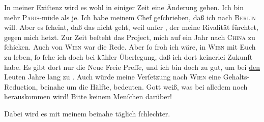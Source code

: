 \pstart
           {\pb}In meiner Exiſtenz wird es wohl in
               einiger Zeit  eine Änderung geben. Ich bin mehr \textsc{Paris}\textcolor{gray}{-}müde als je. Ich habe meinem Chef geſchrieben, daß ich nach \textsc{Berlin} will. Aber es ſcheint, daß das nicht geht, weil unſer \label{K_L02835-3v}\label{K_L02835-3}, der meine
               Rivalität fürchtet, gegen mich hetzt. Zur Zeit beſteht das Project, mich auf ein Jahr
               nach \textsc{China} zu ſchicken. Auch von \textsc{Wien} war die Rede. Aber ſo froh ich wäre, in \textsc{Wien} mit Euch zu leben, ſo ſehe ich doch  bei kühler Überlegung, daß ich dort keinerlei Zukunft habe. Es gibt dort nur
               die Neue Freie Preſſe, und ich bin  doch zu gut, um bei \uline{den} Leuten Jahre lang zu \label{K_L02835-4v}\label{K_L02835-4}.
               Auch würde meine Verſetzung nach \textsc{Wien} eine Gehalts-Reduction, beinahe um die Hälfte, bedeuten. Gott weiß, was bei
               alledem noch herauskommen wird! Bitte\label{T_L02835-1v}\label{T_L02835-1} keinem Menſchen darüber!\pend
           
\pstart
           {\pb}Dabei wird es mit meinem \label{K_L02835-5v}\label{K_L02835-5} beinahe täglich ſchlechter.\pend
           
